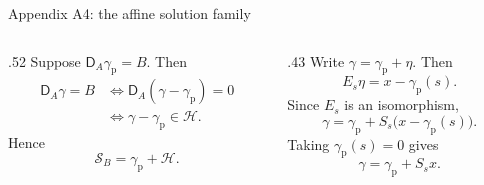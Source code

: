 \begin{frame}[t]{Appendix A4: the affine solution family}
\hypertarget{app:affine}{}
\begin{columns}[T,onlytextwidth]
  \begin{column}{.52\textwidth}
    Suppose $\mathsf D_A\gamma_{\mathrm p}=B$. Then
    \begin{equation*}
      \begin{aligned}
        \mathsf D_A\gamma=B
          &\iff\mathsf D_A(\gamma-\gamma_{\mathrm p})=0\\
          &\iff\gamma-\gamma_{\mathrm p}\in\mathcal H.
      \end{aligned}
    \end{equation*}
    Hence
    \begin{equation*}
      \mathcal S_B=\gamma_{\mathrm p}+\mathcal H.
    \end{equation*}
  \end{column}
  \begin{column}{.43\textwidth}
    Write $\gamma=\gamma_{\mathrm p}+\eta$. Then
    \begin{equation*}
      E_s\eta=x-\gamma_{\mathrm p}(s).
    \end{equation*}
    Since $E_s$ is an isomorphism,
    \begin{equation*}
      \gamma=\gamma_{\mathrm p}
        +S_s\bigl(x-\gamma_{\mathrm p}(s)\bigr).
    \end{equation*}
    Taking $\gamma_{\mathrm p}(s)=0$ gives
    \begin{equation*}
      \gamma=\gamma_{\mathrm p}+S_sx.
    \end{equation*}
  \end{column}
\end{columns}
\end{frame}

